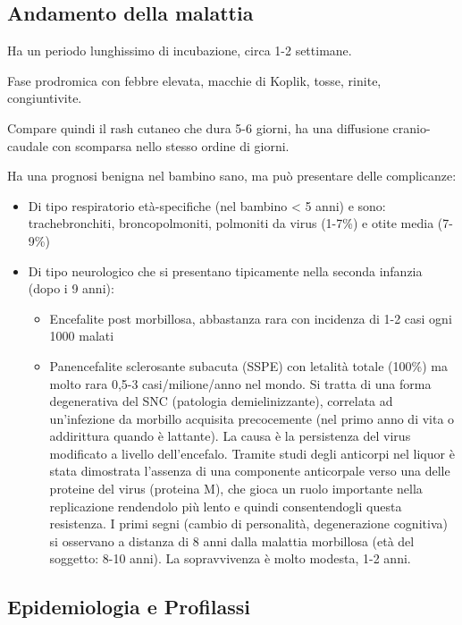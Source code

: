 \subsection{Andamento della malattia}

Ha un periodo lunghissimo di incubazione, circa 1-2 settimane.

Fase prodromica con febbre elevata,
macchie di Koplik, tosse, rinite, congiuntivite.

Compare quindi il rash cutaneo che dura 5-6 giorni, ha una diffusione
cranio-caudale con scomparsa nello stesso ordine di giorni.

Ha una prognosi benigna nel bambino sano, ma può presentare delle
complicanze:

\begin{itemize}
\item
  Di tipo respiratorio età-specifiche (nel bambino \textless{} 5 anni) e
  sono: trachebronchiti, broncopolmoniti, polmoniti da virus (1-7\%) e
  otite media (7-9\%)
\item
  Di tipo neurologico che si presentano tipicamente nella seconda
  infanzia (dopo i 9 anni):

\begin{itemize}
\item
  Encefalite post morbillosa, abbastanza rara con incidenza di 1-2 casi
  ogni 1000 malati 
\item
  Panencefalite sclerosante subacuta (SSPE) con letalità totale (100\%)
  ma molto rara 0,5-3 casi/milione/anno nel mondo. Si tratta di una
  forma degenerativa del SNC (patologia demielinizzante), correlata ad
  un'infezione da morbillo acquisita precocemente (nel primo anno di
  vita o addirittura quando è lattante). La causa è la persistenza del
  virus modificato a livello dell'encefalo. Tramite studi degli
  anticorpi nel liquor è stata dimostrata l'assenza di una componente
  anticorpale verso una delle proteine del virus (proteina M), che gioca
  un ruolo importante nella replicazione rendendolo più lento e quindi
  consentendogli questa resistenza. I primi segni (cambio di
  personalità, degenerazione cognitiva) si osservano a distanza di 8
  anni dalla malattia morbillosa (età del soggetto: 8-10 anni). La
  sopravvivenza è molto modesta, 1-2 anni. 
\end{itemize}
\end{itemize}

\subsection{Epidemiologia e Profilassi}

